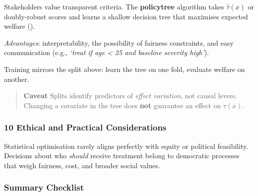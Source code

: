 \documentclass[
  single column]{article}
\begin{document}
Stakeholders value transparent criteria. The \textbf{policytree}
algorithm takes \(\widehat{\tau}(x)\) or doubly-robust scores and learns
a shallow decision tree that maximises expected welfare
().

\emph{Advantages}: interpretability, the possibility of fairness
constraints, and easy communication (e.g., \emph{`treat if age
\textless{} 25 and baseline severity high'}).

Training mirrors the split above: learn the tree on one fold, evaluate
welfare on another.

\begin{quote}
\textbf{Caveat} Splits identify predictors of \emph{effect variation},
not causal levers. Changing a covariate in the tree does \textbf{not}
guarantee an effect on \(\tau(x)\).
\end{quote}

\subsubsection{10 Ethical and Practical
Considerations}\label{ethical-and-practical-considerations}

Statistical optimisation rarely aligns perfectly with equity or
political feasibility. Decisions about who \emph{should} receive
treatment belong to democratic processes that weigh fairness, cost, and
broader social values.

\subsubsection{Summary Checklist}\label{summary-checklist}
\end{document}
